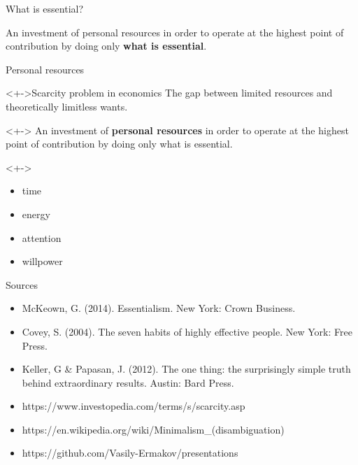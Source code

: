 \documentclass{beamer}
\begin{document}
    \begin{frame}{What is essential?}
        \begin{block}{}
            An investment of personal resources in order to operate at the highest point of contribution by doing only \textbf{what is essential}.
        \end{block}
    \end{frame}

    \begin{frame}{Personal resources}
        \begin{block}
            <+->{Scarcity problem in economics}
            The gap between limited resources and theoretically limitless wants.
        \end{block}
        \begin{block}
            <+->{}
            An investment of \textbf{personal resources} in order to operate at the highest point of contribution by doing only what is essential.
        \end{block}
        \begin{block}
            <+->{}
            \begin{itemize}
                \item time
                \item energy
                \item attention
                \item willpower
            \end{itemize}
        \end{block}
    \end{frame}

    \begin{frame}{Sources}
        \begin{block}{}
            \begin{itemize}
                \item McKeown, G. (2014). Essentialism. New York: Crown Business.
                \item Covey, S. (2004). The seven habits of highly effective people. New York: Free Press.
                \item Keller, G \& Papasan, J. (2012). The one thing: the surprisingly simple truth behind extraordinary results. Austin: Bard Press.
                \item https://www.investopedia.com/terms/s/scarcity.asp
                \item https://en.wikipedia.org/wiki/Minimalism\_(disambiguation)
                \item https://github.com/Vasily-Ermakov/presentations
            \end{itemize}
        \end{block}
    \end{frame}
\end{document}
